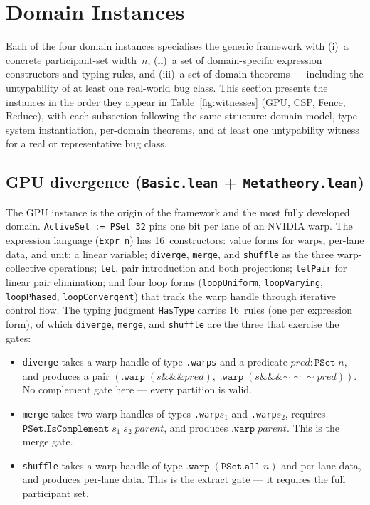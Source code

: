 \documentclass[acmsmall,screen,review,anonymous,nonacm]{acmart}
\newcommand{\PSet}{\texttt{PSet}}
\begin{document}

\section{Domain Instances}\label{sec:domains}

Each of the four domain instances specialises the generic framework with (i)~a concrete participant-set width~$n$, (ii)~a set of domain-specific expression constructors and typing rules, and (iii)~a set of domain theorems --- including the untypability of at least one real-world bug class. This section presents the instances in the order they appear in Table~\ref{fig:witnesses} (GPU, CSP, Fence, Reduce), with each subsection following the same structure: domain model, type-system instantiation, per-domain theorems, and at least one untypability witness for a real or representative bug class.

\subsection{GPU divergence (\texttt{Basic.lean} + \texttt{Metatheory.lean})}\label{sec:gpu-divergence}

The GPU instance is the origin of the framework and the most fully developed domain. \texttt{ActiveSet := PSet 32} pins one bit per lane of an NVIDIA warp. The expression language (\texttt{Expr n}) has 16~constructors: value forms for warps, per-lane data, and unit; a linear variable; \texttt{diverge}, \texttt{merge}, and \texttt{shuffle} as the three warp-collective operations; \texttt{let}, pair introduction and both projections; \texttt{letPair} for linear pair elimination; and four loop forms (\texttt{loopUniform}, \texttt{loopVarying}, \texttt{loopPhased}, \texttt{loopConvergent}) that track the warp handle through iterative control flow. The typing judgment \texttt{HasType} carries 16~rules (one per expression form), of which \texttt{diverge}, \texttt{merge}, and \texttt{shuffle} are the three that exercise the gates:

\begin{itemize}
  \item \texttt{diverge} takes a warp handle of type \texttt{.warp\;s} and a predicate $\mathit{pred} : \PSet\;n$, and produces a pair $(\texttt{.warp}\;(s \mathbin{\&\&\&} \mathit{pred}),\; \texttt{.warp}\;(s \mathbin{\&\&\&} {\mathord{\sim\!\sim\!\sim}\mathit{pred}}))$. No complement gate here --- every partition is valid.
  \item \texttt{merge} takes two warp handles of types \texttt{.warp\;$s_1$} and \texttt{.warp\;$s_2$}, requires $\texttt{PSet.IsComplement}\;s_1\;s_2\;\mathit{parent}$, and produces $\texttt{.warp}\;\mathit{parent}$. This is the merge gate.
  \item \texttt{shuffle} takes a warp handle of type $\texttt{.warp}\;(\texttt{PSet.all}\;n)$ and per-lane data, and produces per-lane data. This is the extract gate --- it requires the full participant set.
\end{itemize}
\end{document}
